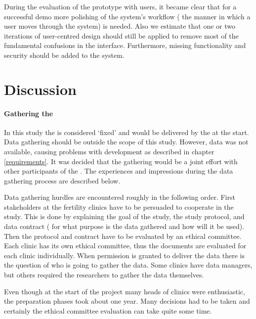 During the evaluation of the prototype with users, it became clear that for a successful demo more polishing of the system's workflow (\ie{} the manner in which a user moves through the system) is needed.
Also we estimate that one or two iterations of user-centred design should still be applied to remove most of the fundamental confusions in the interface.
Furthermore, missing functionality and security should be added to the system.

\section{Discussion}

\paragraph{Gathering the \projectdata{}}

In this study the \projectdata{} is considered `fixed' and would be delivered by the \project{} at the start.
Data gathering should be outside the scope of this study.
However, data was not available, causing problems with development as described in chapter \ref{requirements}.
It was decided that the gathering would be a joint effort with other participants of the \project{}.
The experiences and impressions during the data gathering process are described below.

Data gathering hurdles are encountered roughly in the following order.
First stakeholders at the fertility clinics have to be persuaded to cooperate in the study.
This is done by explaining the goal of the study, the study protocol, and data contract (\ie{} for what purpose is the data gathered and how will it be used).
Then the protocol and contract have to be evaluated by an ethical committee.
Each clinic has its own ethical committee, thus the documents are evaluated for each clinic individually.
When permission is granted to deliver the data there is the question of who is going to gather the data.
Some clinics have data managers, but others required the \project{} researchers to gather the data themselves.

Even though at the start of the project many heads of clinics were enthusiastic, the preparation phases took about one year.
Many decisions had to be taken and certainly the ethical committee evaluation can take quite some time. 


